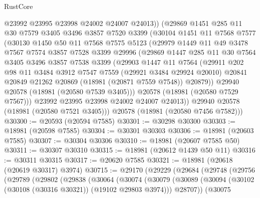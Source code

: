 \begin{lexlean}{RustCore}
\begin{coremodule}
          @23992
          @23995
          @23998
          @24002
          @24007
          @24013))
      (@29869
        @1451
        @285
        @11
        @30
        @7579
        @3405
        @3496
        @3857
        @7520
        @3399
        (@30104
          @1451
          @11
          @7568
          @7577
          (@30130
            @1450
            @50
            @11
            @7568
            @7575
            @5123
            (@29979
              @1449
              @11
              @49
              @3478
              @7567
              @7574
              @3857
              @7528
              @3399
              @29996
              (@29869
                @1447
                @285
                @11
                @30
                @7564
                @3405
                @3496
                @3857
                @7538
                @3399
                (@29903
                  @1447
                  @11
                  @7564
                  (@29911
                    @202
                    @98
                    @11
                    @3484
                    @3912
                    @7547
                    @7559
                    (@29921 @3484 @29924 @20010)
                    @20841
                    @20849
                    @21262
                    @20869
                    (@18981 (@20871 @7559 @7548))
                    @20879))
                @29940
                @20578
                (@18981 (@20580 @7539 @3405)))
              @20578
              (@18981 (@20580 @7529 @7567)))
            @23992
            @23995
            @23998
            @24002
            @24007
            @24013))
        @29940
        @20578
        (@18981 (@20580 @7521 @3405)))
      @20578
      (@18981 (@20580 @7456 @7582)))
@30300 := @20593 (@20594 @7585)
@30301 := @30298 @30300
@30303 := @18981 (@20598 @7585)
@30304 := @30301 @30303
@30306 := @18981 (@20603 @7585)
@30307 := @30304 @30306
@30310 := @18981 (@20607 @7585 @50)
@30311 := @30307 @30310
@30315 := @18981 (@20612 @1439 @50 @11)
@30316 := @30311 @30315
@30317 := @20620 @7585
@30321 := @18981 (@20618 (@20619 @30317) @3974)
@30715 := @29170
    (@29229
      (@29684
        (@29748
          (@29756
            (@29789
              (@29802
                (@29838
                  (@30064
                    (@30074
                      (@30079
                        (@30089
                          (@30094 (@30102 (@30108 (@30316 @30321)) (@19102 @29803 @3974)))
                          @28707))
                      (@30075

\end{coremodule}
\end{lexlean}
